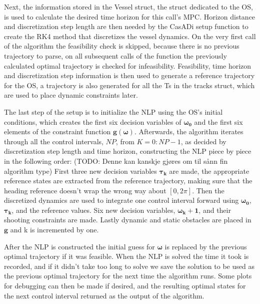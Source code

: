 Next, the information stored in the Vessel struct, the struct dedicated to the \gls{OS}, is used to calculate the desired time horizon for this call's
\gls{MPC}. Horizon distance and discretization step length are then needed by the CasADi setup function to create the \gls{RK4} method that
discretizes the vessel dynamics. On the very first call of the algorithm the feasibility check is skipped, because there is no previous trajectory to parse,
on all subsequent calls of the function the previously calculated optimal trajectory is checked for infeasibility. 
Feasibility, time horizon and discretization step information is then used to generate a reference trajectory for the \gls{OS}, a trajectory is
also generated for all the \gls{Ts} in the tracks struct, which are used to place dynamic constraints later.

The last step of the setup is to initialize the NLP using the \gls{OS}'s initial conditions, which creates the first
six decision variables of $\bm{\omega_0}$ and the first six elements of the constraint function $\textbf{g}(\bm{\omega})$.
Afterwards, the algorithm iterates through all the control intervals, $NP$, from $K = 0:NP-1$, as decided by discretization step length and time horizon, 
constructing the NLP piece by piece in the following order:\newline
(TODO: Denne kan kanskje gjøres om til sånn fin algorithm type)\newline 
First three new decision variables $\bm{\tau_k}$ are made, the appropriate reference states are extracted from the reference trajectory, making sure
that the heading reference doesn't wrap the wrong way about $[0, 2\pi]$. Then the discretized dynamics are used to integrate one control interval
forward using $\bm{\omega_0}$, $\bm{\tau_k}$, and the reference values. Six new decision variables, $\bm{\omega_k+1}$, and their shooting
constraints are made. Lastly dynamic and static obstacles are placed in $\textbf{g}$ and k is incremented by one.

After the \gls{NLP} is constructed the initial guess for $\bm{\omega}$ is replaced by the previous optimal trajectory if it was feasible.
When the \gls{NLP} is solved the time it took is recorded, and if it didn't take too long to solve we save the solution to be used as the previous
optimal trajectory for the next time the algorithm runs. Some plots for debugging can then be made if desired, and the resulting optimal states
for the next control interval returned as the output of the algorithm.



